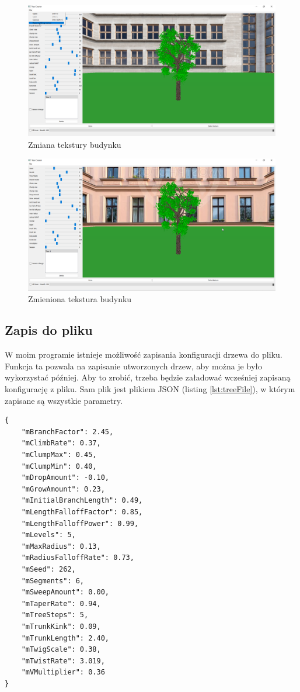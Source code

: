 \documentclass[a4paper,12pt,twoside]{book} %
\begin{document}
\begin{figure}[H]
	\centering\includegraphics[width=15.5cm]{grafika/program/texture4.png}
	\caption{Zmiana tekstury budynku}
    \label{fig:choosebuild}
\end{figure}

\begin{figure}[H]
	\centering\includegraphics[width=15.5cm]{grafika/program/texture5.png}
	\caption{Zmieniona tekstura budynku}
    \label{fig:choosebuild2}
\end{figure}

\subsection{Zapis do pliku}

W moim programie istnieje możliwość zapisania konfiguracji drzewa do pliku. 
Funkcja ta pozwala na zapisanie utworzonych drzew, aby można je było 
wykorzystać później. Aby to zrobić, trzeba będzie 
załadować wcześniej zapisaną konfigurację z pliku.
Sam plik jest plikiem JSON (listing \ref{lst:treeFile}), w którym zapisane są wszystkie parametry.

\begin{lstlisting}[caption={Zawartość pliku drzewa}, label={lst:treeFile}]
{
    "mBranchFactor": 2.45,
    "mClimbRate": 0.37,
    "mClumpMax": 0.45,
    "mClumpMin": 0.40,
    "mDropAmount": -0.10,
    "mGrowAmount": 0.23,
    "mInitialBranchLength": 0.49,
    "mLengthFalloffFactor": 0.85,
    "mLengthFalloffPower": 0.99,
    "mLevels": 5,
    "mMaxRadius": 0.13,
    "mRadiusFalloffRate": 0.73,
    "mSeed": 262,
    "mSegments": 6,
    "mSweepAmount": 0.00,
    "mTaperRate": 0.94,
    "mTreeSteps": 5,
    "mTrunkKink": 0.09,
    "mTrunkLength": 2.40,
    "mTwigScale": 0.38,
    "mTwistRate": 3.019,
    "mVMultiplier": 0.36
}
\end{lstlisting}
\end{document}

